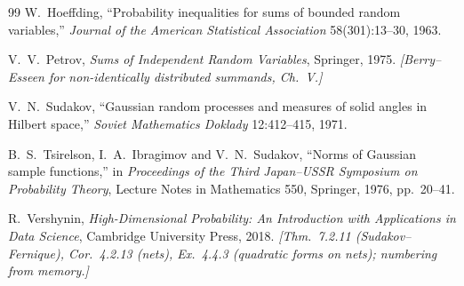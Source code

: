 \documentclass[11pt]{article}
\theoremstyle{definition}
\theoremstyle{plain}
\begin{document}
\begin{thebibliography}{99}
W.~Hoeffding, ``Probability inequalities for sums of bounded random variables,'' \textit{Journal of the American Statistical Association} 58(301):13--30, 1963.

V.~V.~Petrov, \textit{Sums of Independent Random Variables}, Springer, 1975. \emph{[Berry--Esseen for non-identically distributed summands, Ch.~V.]}

V.~N.~Sudakov, ``Gaussian random processes and measures of solid angles in Hilbert space,'' \textit{Soviet Mathematics Doklady} 12:412--415, 1971.

B.~S.~Tsirelson, I.~A.~Ibragimov and V.~N.~Sudakov, ``Norms of Gaussian sample functions,'' in \textit{Proceedings of the Third Japan--USSR Symposium on Probability Theory}, Lecture Notes in Mathematics 550, Springer, 1976, pp.~20--41.

R.~Vershynin, \textit{High-Dimensional Probability: An Introduction with Applications in Data Science}, Cambridge University Press, 2018. \emph{[Thm.~7.2.11 (Sudakov--Fernique), Cor.~4.2.13 (nets), Ex.~4.4.3 (quadratic forms on nets); numbering from memory.]}

\end{thebibliography}
\end{document}
